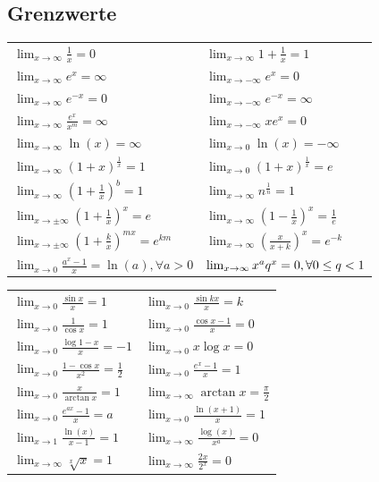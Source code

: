 \documentclass[a4paper,fontsize = 7pt]{scrartcl}
\renewcommand*{\arraystretch}{2}
\def\limxo{\lim_{x\to 0}}
\def\limxi{\lim_{x\to\infty}}
\def\limxn{\lim_{x\to-\infty}}
\begin{document}
\subsection{Grenzwerte}
\arraycolsep=1pt\def\arraystretch{1.5}
\begin{center}
  \begin{tabularx}{\linewidth}{XX}
    \toprule
    $\limxi \frac{1}{x} = 0$ & $\limxi 1 + \frac{1}{x} = 1$ \\
    $\limxi e^x = \infty$ & $\limxn e^x = 0$ \\
    $\limxi e^{-x} = 0$ & $\limxn e^{-x} = \infty$ \\
    $\limxi \frac{e^x}{x^m} = \infty$ & $\limxn xe^x = 0$ \\
    $\limxi \ln(x) = \infty$ & $\limxo \ln(x) = -\infty$ \\
    $\limxi (1+x)^{\frac{1}{x}} = 1$ & $\limxo (1+x)^{\frac{1}{x}} = e$ \\
    $\limxi (1+\frac{1}{x})^b = 1$ & $\limxi n^{\frac{1}{n}} = 1$ \\
    $\lim_{x\to\pm\infty} (1 + \frac{1}{x})^x = e$ & $\limxi (1-\frac{1}{x})^x = \frac{1}{e}$ \\
    $\lim_{x\to\pm\infty} (1 + \frac{k}{x})^{mx} = e^{km}$ & $\limxi (\frac{x}{x+k})^x = e^{-k}$ \\
    $\limxo \frac{a^x -1}{x} = \ln(a), \forall a > 0$ &
    $\limxi x^a q^x = 0, \newline \forall 0 \le q < 1$ \\
  \end{tabularx}
  \begin{tabularx}{\linewidth}{XX}
    $\limxo \frac{\sin x}{x} = 1$ & $\limxo \frac{\sin kx}{x} = k$\\
    $\limxo \frac{1}{\cos x} = 1$ & $\limxo \frac{\cos x -1}{x} = 0$ \\
    $\limxo \frac{\log 1 - x}{x} = -1$ & $\limxo x \log x = 0$\\
    $\limxo \frac{1 - \cos x}{x^2} = \frac{1}{2}$ & $\limxo \frac{e^x-1}{x} = 1$ \\
    $\limxo \frac{x}{\arctan x} = 1$ & $\limxi \arctan x = \frac{\pi}{2}$ \\
    $\limxo \frac{e^{ax}-1}{x} = a$ & $\limxo \frac{\ln(x+1)}{x} = 1$ \\
    $\lim_{x\to 1} \frac{\ln(x)}{x-1} = 1$ & $\limxi \frac{\log(x)}{x^a} = 0$ \\
    $\limxi \sqrt[x]{x} = 1$ & $\limxi \frac{2x}{2^x} = 0$ \\
    \bottomrule
  \end{tabularx}
\end{center}
\end{document}
